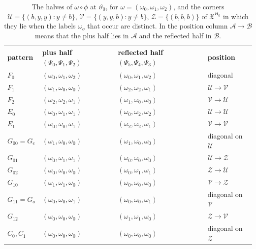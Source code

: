 \begin{table}[ht]
\centering\small
\begin{tabular}{@{}llll@{}}
\toprule
pattern & plus half $(\Psi_0,\Psi_1,\Psi_2)$ & reflected half $(\Psi_5,\Psi_4,\Psi_3)$ & position\\
\midrule
$F_0$ & $(\omega_0,\omega_1,\omega_2)$ & $(\omega_0,\omega_1,\omega_2)$ & diagonal\\
$F_1$ & $(\omega_1,\omega_0,\omega_0)$ & $(\omega_2,\omega_2,\omega_1)$ & $\mathcal U\to\mathcal V$\\
$F_2$ & $(\omega_2,\omega_2,\omega_1)$ & $(\omega_1,\omega_0,\omega_0)$ & $\mathcal V\to\mathcal U$\\
$E_0$ & $(\omega_0,\omega_1,\omega_1)$ & $(\omega_0,\omega_2,\omega_2)$ & $\mathcal U\to\mathcal U$\\
$E_1$ & $(\omega_0,\omega_0,\omega_1)$ & $(\omega_2,\omega_2,\omega_1)$ & $\mathcal V\to\mathcal V$\\
$G_{00}=G_e$ & $(\omega_1,\omega_0,\omega_0)$ & $(\omega_1,\omega_0,\omega_0)$ & diagonal on $\mathcal U$\\
$G_{01}$ & $(\omega_0,\omega_1,\omega_1)$ & $(\omega_0,\omega_0,\omega_0)$ & $\mathcal U\to\mathcal Z$\\
$G_{02}$ & $(\omega_0,\omega_0,\omega_0)$ & $(\omega_0,\omega_1,\omega_1)$ & $\mathcal Z\to\mathcal U$\\
$G_{10}$ & $(\omega_1,\omega_1,\omega_0)$ & $(\omega_0,\omega_0,\omega_0)$ & $\mathcal V\to\mathcal Z$\\
$G_{11}=G_o$ & $(\omega_0,\omega_0,\omega_1)$ & $(\omega_0,\omega_0,\omega_1)$ & diagonal on $\mathcal V$\\
$G_{12}$ & $(\omega_0,\omega_0,\omega_0)$ & $(\omega_1,\omega_1,\omega_0)$ & $\mathcal Z\to\mathcal V$\\
$C_0,C_1$ & $(\omega_0,\omega_0,\omega_0)$ & $(\omega_0,\omega_0,\omega_0)$ & diagonal on $\mathcal Z$\\
\bottomrule
\end{tabular}
\caption{The halves of $\omega\circ\phi$ at $\vartheta_0$, for
$\omega=(\omega_0,\omega_1,\omega_2)$, and the corners
$\mathcal U=\{(b,y,y)\colon y\ne b\}$, $\mathcal V=\{(y,y,b)\colon y\ne b\}$,
$\mathcal Z=\{(b,b,b)\}$ of $\mathfrak X^{H_0}$ in which they lie when the
labels $\omega_o$ that occur are distinct. In the position column
$\mathcal A\to\mathcal B$ means that the plus half lies in $\mathcal A$ and
the reflected half in $\mathcal B$.}
\label{tab:corner}
\end{table}

